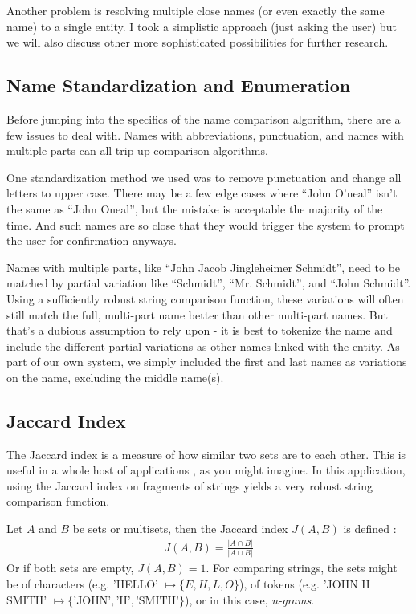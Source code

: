 \documentclass[11pt]{article}
\begin{document}
{Another problem is resolving multiple close names (or even exactly the same name) to a single entity.
I took a simplistic approach (just asking the user) but we will also discuss other more
sophisticated possibilities for further research. 

\subsection{Name Standardization and Enumeration}
Before jumping into the specifics of the name comparison algorithm, there are a few issues
to deal with. Names with abbreviations, punctuation, and names with multiple parts can all
trip up comparison algorithms.

One standardization method we used was to remove punctuation and change all letters to upper case.
There may be a few edge cases where ``John O'neal'' isn't the same as ``John Oneal'',
but the mistake is acceptable the majority of the time. And such names are so close that they would
trigger the system to prompt the user for confirmation anyways.

Names with multiple parts, like ``John Jacob Jingleheimer Schmidt'', need to be matched by
partial variation like ``Schmidt'', ``Mr. Schmidt'', and ``John Schmidt''. 
Using a sufficiently robust string comparison function, these variations will often 
still match the full, multi-part name better than other multi-part names.
But that's a dubious assumption to rely upon - it is best to tokenize the name and
include the different partial variations as other names linked with the entity.
As part of our own system, we simply included the first and last names as variations on
the name, excluding the middle name(s).

\subsection{Jaccard Index}
The Jaccard index is a measure of how similar two sets are to each other.
This is useful in a whole host of applications \cite{general}, as you might imagine. 
In this application, using the Jaccard index on fragments of strings yields a very
robust string comparison function.

Let $A$ and $B$ be sets or multisets, then the Jaccard index $J(A,B)$ is defined \cite{mining, comparison}:
\begin{align*}
    J(A, B) = \frac{\left| A \cap B \right|}{\left| A \cup B \right|}
\end{align*}
Or if both sets are empty, $J(A,B) = 1$.
For comparing strings, the sets might be of characters (e.g. 'HELLO' $\mapsto \{E, H, L, O\}$), 
of tokens (e.g. 'JOHN H SMITH' $\mapsto \{\text{'JOHN'}, \text{'H'}, \text{'SMITH'}\}$),
or in this case, {\em n-grams}.

}
\end{document}
